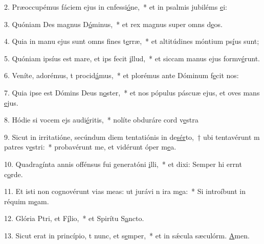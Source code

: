 2. Præoccupémus fáciem ejus in cnfessi\uline{ó}ne,~* et in psalmis jubiléms \uline{e}i:\par 
3. Quóniam Des magnus D\uline{ó}minus,~* et rex magnus super omns d\uline{e}os.\par 
4. Quia in manu ejus sunt omns fines t\uline{e}rræ,~* et altitúdines móntium ps\uline{í}us sunt;\par 
5. Quóniam ipsíus est mare, et ips fecit \uline{i}llud,~* et siccam manus ejus formv\uline{é}runt.\par 
6. Veníte, adorémus, t procid\uline{á}mus,~* et plorémus ante Dóminum  f\uline{e}cit nos:\par 
7. Quia ipse est Dómins Deus n\uline{o}ster,~* et nos pópulus páscuæ ejus, et oves mans \uline{e}jus.\par 
8. Hódie si vocem ejs audi\uline{é}ritis,~* nolíte obduráre cord v\uline{e}stra\par 
9. Sicut in irritatióne, secúndum diem tentatiónis in de\uline{sér}to,~† ubi tentavérunt m patres v\uline{e}stri:~* probavérunt me, et vidérunt óper m\uline{e}a.\par 
10. Quadragínta annis offénsus fui generatóni \uline{i}lli,~* et dixi: Semper hi errnt c\uline{o}rde.\par 
11. Et isti non cognovérunt vias meas: ut jurávi n ira m\uline{e}a:~* Si introíbunt in réquim m\uline{e}am.\par 
12. Glória Ptri, et F\uline{í}lio,~* et Spirítu S\uline{a}ncto.\par 
13. Sicut erat in princípio, t nunc, et s\uline{e}mper,~* et in sǽcula sæculórm. \uline{A}men.\par 
